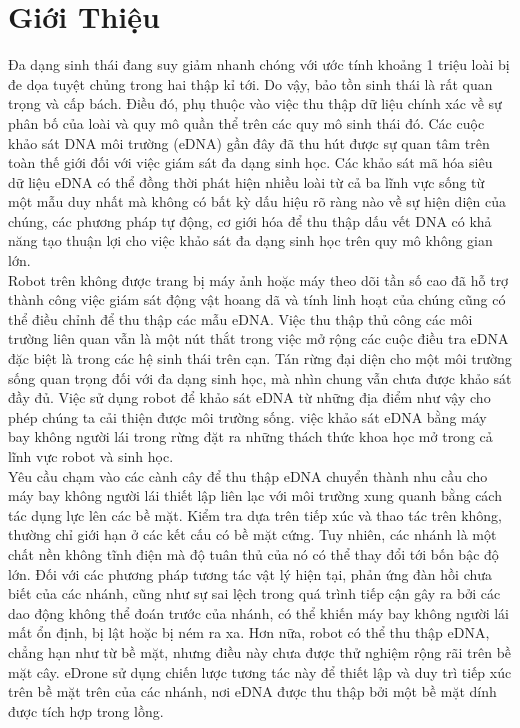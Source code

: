 \documentclass[12pt,a4paper]{article}
\begin{document}
\section{Giới Thiệu}
Đa dạng sinh thái đang suy giảm nhanh chóng với ước tính khoảng 1 triệu loài bị đe dọa tuyệt chủng trong hai thập kỉ tới. Do vậy, bảo tồn sinh thái là rất quan trọng và cấp bách. Điều đó, phụ thuộc vào việc thu thập dữ liệu chính xác về sự phân bố của loài và quy mô quần thể trên các quy mô sinh thái đó. Các cuộc khảo sát DNA môi trường (eDNA) gần đây đã thu hút được sự quan tâm trên toàn thế giới đối với việc giám sát đa dạng sinh học. Các khảo sát mã hóa siêu dữ liệu eDNA có thể đồng thời phát hiện nhiều loài từ cả ba lĩnh vực sống từ một mẫu duy nhất mà không có bất kỳ dấu hiệu rõ ràng nào về sự hiện diện của chúng, các phương pháp tự động, cơ giới hóa để thu thập dấu vết DNA có khả năng tạo thuận lợi cho việc khảo sát đa dạng sinh học trên quy mô không gian lớn.\\
\linebreak
Robot trên không được trang bị máy ảnh hoặc máy theo dõi tần số cao đã hỗ trợ thành công việc giám sát động vật hoang dã  và tính linh hoạt của chúng cũng có thể điều chỉnh để thu thập các mẫu eDNA. Việc thu thập thủ công các môi trường liên quan vẫn là một nút thắt trong việc mở rộng các cuộc điều tra eDNA đặc biệt là trong các hệ sinh thái trên cạn. Tán rừng đại diện cho một môi trường sống quan trọng đối với đa dạng sinh học, mà nhìn chung vẫn chưa được khảo sát đầy đủ. Việc sử dụng robot để khảo sát eDNA từ những địa điểm như vậy cho phép chúng ta cải thiện được môi trường sống. việc khảo sát eDNA bằng máy bay không người lái trong rừng đặt ra những thách thức khoa học mở trong cả lĩnh vực robot và sinh học.\\
\linebreak
Yêu cầu chạm vào các cành cây để thu thập eDNA chuyển thành nhu cầu cho máy bay không người lái thiết lập liên lạc với môi trường xung quanh bằng cách tác dụng lực lên các bề mặt. Kiểm tra dựa trên tiếp xúc và thao tác trên không, thường chỉ giới hạn ở các kết cấu có bề mặt cứng. Tuy nhiên, các nhánh là một chất nền không tĩnh điện mà độ tuân thủ của nó có thể thay đổi tới bốn bậc độ lớn. Đối với các phương pháp tương tác vật lý hiện tại, phản ứng đàn hồi chưa biết của các nhánh, cũng như sự sai lệch trong quá trình tiếp cận gây ra bởi các dao động không thể đoán trước của nhánh, có thể khiến máy bay không người lái mất ổn định, bị lật hoặc bị ném ra xa. Hơn nữa, robot có thể thu thập eDNA, chẳng hạn như từ bề mặt, nhưng điều này chưa được thử nghiệm rộng rãi trên bề mặt cây. eDrone sử dụng chiến lược tương tác này để thiết lập và duy trì tiếp xúc trên bề mặt trên của các nhánh, nơi eDNA được thu thập bởi một bề mặt dính được tích hợp trong lồng.\\
\end{document}
